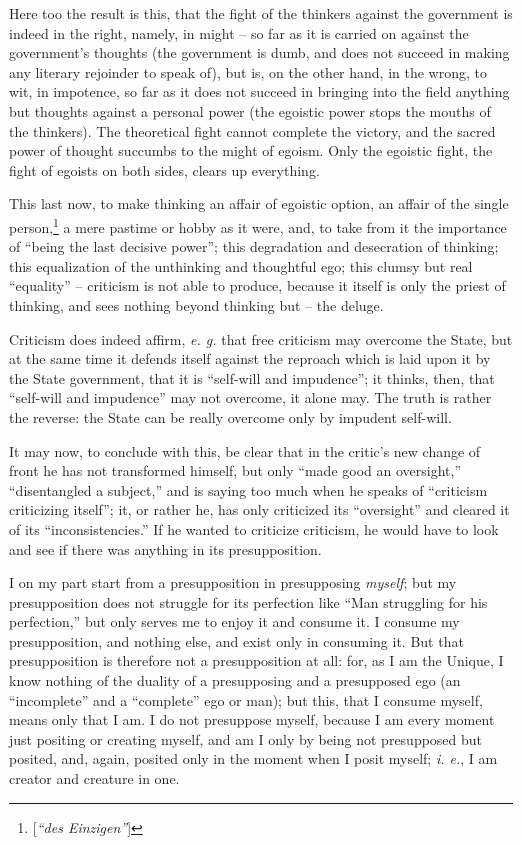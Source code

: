 \documentclass[12pt,a4paper]{book}
\begin{document}
Here too the result is this, that the fight of the thinkers against the 
government is indeed in the right, namely, in might -- so far as it is carried 
on against the government's thoughts (the government is dumb, and does not 
succeed in making any literary rejoinder to speak of), but is, on the other 
hand, in the wrong, to wit, in impotence, so far as it does not succeed in 
bringing into the field anything but thoughts against a personal power (the 
egoistic power stops the mouths of the thinkers). The theoretical fight cannot 
complete the victory, and the sacred power of thought succumbs to the might of 
egoism. Only the egoistic fight, the fight of egoists on both sides, clears up 
everything.

This last now, to make thinking an affair of egoistic option, an affair of the 
single person,\footnote{[\textit{``des Einzigen''}]} a mere pastime or hobby 
as it were, and, to take from it the importance of ``being the last decisive 
power''; this degradation and desecration of thinking; this equalization of 
the unthinking and thoughtful ego; this clumsy but real ``equality'' -- 
criticism is not able to produce, because it itself is only the priest of 
thinking, and sees nothing beyond thinking but -- the deluge.

Criticism does indeed affirm, \textit{e. g.} that free criticism may overcome 
the State, but at the same time it defends itself against the reproach which 
is laid upon it by the State government, that it is ``self-will and 
impudence''; it thinks, then, that ``self-will and impudence'' may not 
overcome, it alone may. The truth is rather the reverse: the State can be 
really overcome only by impudent self-will.

It may now, to conclude with this, be clear that in the critic's new change of 
front he has not transformed himself, but only ``made good an oversight,'' 
``disentangled a subject,'' and is saying too much when he speaks of 
``criticism criticizing itself''; it, or rather he, has only criticized its 
``oversight'' and cleared it of its ``inconsistencies.'' If he wanted to 
criticize criticism, he would have to look and see if there was anything in 
its presupposition.

I on my part start from a presupposition in presupposing \textit{myself}; but 
my presupposition does not struggle for its perfection like ``Man struggling 
for his perfection,'' but only serves me to enjoy it and consume it. I 
consume my presupposition, and nothing else, and exist only in consuming it. 
But that presupposition is therefore not a presupposition at all: for, as I am 
the Unique, I know nothing of the duality of a presupposing and a presupposed 
ego (an ``incomplete'' and a ``complete'' ego or man); but this, that I 
consume myself, means only that I am. I do not presuppose myself, because I am 
every moment just positing or creating myself, and am I only by being not 
presupposed but posited, and, again, posited only in the moment when I posit 
myself; \textit{i. e.}, I am creator and creature in one.
\end{document}
